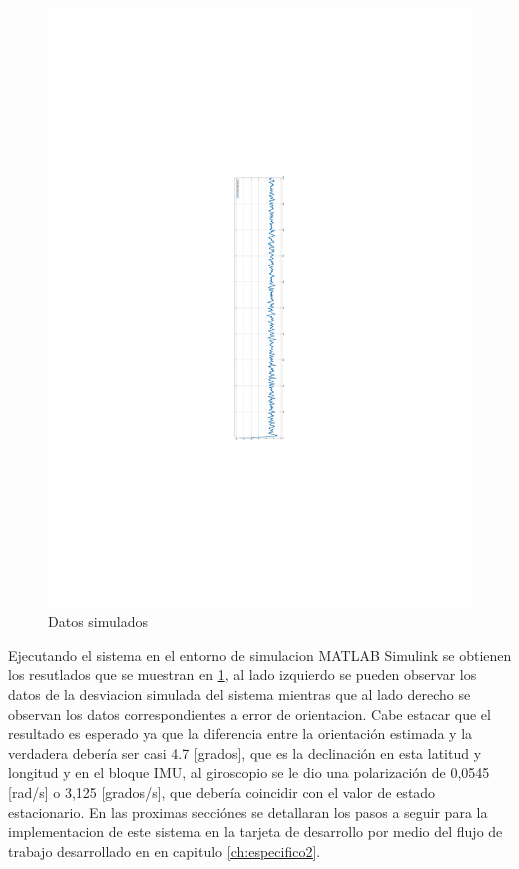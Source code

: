 \begin{figure}[htbp]
    \includegraphics[scale=0.1]{fig/Capitulo5/Caso_de_estudio_IMU/data/simulated/error.pdf}
    \caption{Datos simulados}
    \label{fig:data_simulated}
\end{figure}

Ejecutando el sistema en el entorno de simulacion MATLAB Simulink se obtienen los resutlados que se muestran en \ref{fig:data_simulated}, al lado izquierdo se pueden observar los datos de la desviacion simulada del sistema mientras que al lado derecho se observan los datos correspondientes a error de orientacion. Cabe estacar que el resultado es esperado ya que la diferencia entre la orientación estimada y la verdadera debería ser casi 4.7 [grados], que es la declinación en esta latitud y longitud y en el bloque IMU, al giroscopio se le dio una polarización de 0,0545 [rad/s] o 3,125 [grados/s], que debería coincidir con el valor de estado estacionario. En las proximas secciónes se detallaran los pasos a seguir para la implementacion de este sistema en la tarjeta de desarrollo por medio del flujo de trabajo desarrollado en en capitulo \ref{ch:especifico2}. 

